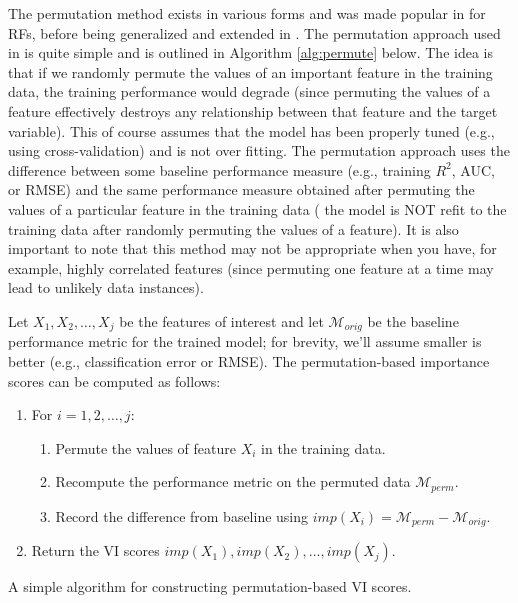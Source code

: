 The permutation method exists in various forms and was made popular in
\citet{random-breiman-2001} for RFs, before being generalized and
extended in \citet{fisher-model-2018}. The permutation approach used in
 is quite simple and is outlined in Algorithm \ref{alg:permute}
below. The idea is that if we randomly permute the values of an
important feature in the training data, the training performance would
degrade (since permuting the values of a feature effectively destroys
any relationship between that feature and the target variable). This of
course assumes that the model has been properly tuned (e.g., using
cross-validation) and is not over fitting. The permutation approach uses
the difference between some baseline performance measure (e.g., training
\(R^2\), AUC, or RMSE) and the same performance measure obtained after
permuting the values of a particular feature in the training data
( the model is NOT refit to the training data after
randomly permuting the values of a feature). It is also important to
note that this method may not be appropriate when you have, for example,
highly correlated features (since permuting one feature at a time may
lead to unlikely data instances).

Let \(X_1, X_2, \dots, X_j\) be the features of interest and let
\(\mathcal{M}_{orig}\) be the baseline performance metric for the
trained model; for brevity, we'll assume smaller is better (e.g.,
classification error or RMSE). The permutation-based importance scores
can be computed as follows:

\begin{algorithm}
\begin{enumerate}
  \item For $i = 1, 2, \dots, j$:
  \begin{enumerate}
    \item Permute the values of feature $X_i$ in the training data.
    \item Recompute the performance metric on the permuted data $\mathcal{M}_{perm}$.
    \item Record the difference from baseline using $imp\left(X_i\right) = \mathcal{M}_{perm} - \mathcal{M}_{orig}$.
  \end{enumerate}
  \item Return the VI scores $imp\left(X_1\right), imp\left(X_2\right), \dots, imp\left(X_j\right)$.
\end{enumerate}
\caption{A simple algorithm for constructing permutation-based VI scores. \label{alg:permute}}
\end{algorithm}

